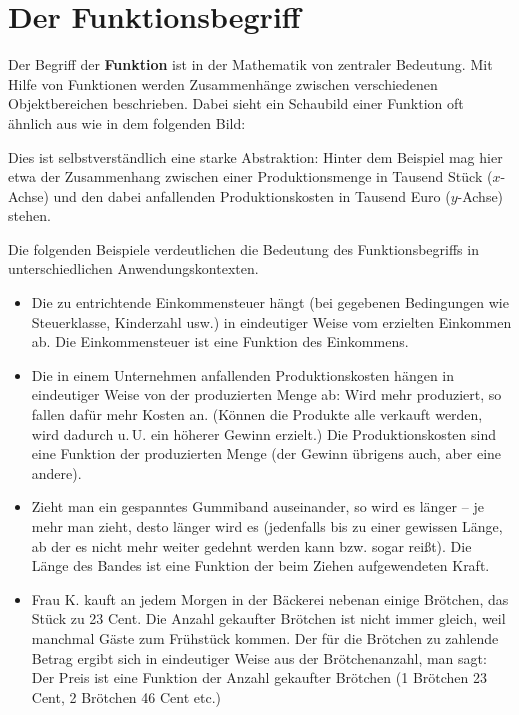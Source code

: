 \section{Der Funktionsbegriff}


Der Begriff der \textbf{Funktion} ist in der Mathematik von zentraler Bedeutung. Mit Hilfe von Funktionen werden Zusammenhänge zwischen verschiedenen Objektbereichen beschrieben. Dabei sieht ein Schaubild einer Funktion oft ähnlich aus wie in dem folgenden Bild:

\begin{center}
\end{center}

Dies ist selbstverständlich eine starke Abstraktion: Hinter dem Beispiel mag hier etwa der Zusammenhang zwischen einer Produktionsmenge in Tausend Stück ($x$-Achse) und den dabei anfallenden Produktionskosten in Tausend Euro ($y$-Achse) stehen.

Die folgenden Beispiele verdeutlichen die Bedeutung des Funktionsbegriffs in unterschiedlichen Anwendungskontexten.
\begin{itemize}
  \item Die zu entrichtende Einkommensteuer hängt (bei gegebenen Bedingungen wie Steuerklasse, Kinderzahl usw.) in eindeutiger Weise vom erzielten Einkommen ab. Die Einkommensteuer ist eine Funktion des Einkommens.
  \item Die in einem Unternehmen anfallenden Produktionskosten hängen in eindeutiger Weise von der produzierten Menge ab: Wird mehr produziert, so fallen dafür mehr Kosten an. (Können die Produkte alle verkauft werden, wird dadurch u.\,U. ein höherer Gewinn erzielt.) Die Produktionskosten sind eine Funktion der produzierten Menge (der Gewinn übrigens auch, aber eine andere).
  \item Zieht man ein gespanntes Gummiband auseinander, so wird es länger -- je mehr man zieht, desto länger wird es (jedenfalls bis zu einer gewissen Länge, ab der es nicht mehr weiter gedehnt werden kann bzw. sogar reißt). Die Länge des Bandes ist eine Funktion der beim Ziehen aufgewendeten Kraft.
  \item Frau K. kauft an jedem Morgen in der Bäckerei nebenan einige Brötchen, das Stück zu 23 Cent. Die Anzahl gekaufter Brötchen ist nicht immer gleich, weil manchmal Gäste zum Frühstück kommen. Der für die Brötchen zu zahlende Betrag ergibt sich in eindeutiger Weise aus der Brötchenanzahl, man sagt: Der Preis ist eine Funktion der Anzahl gekaufter Brötchen (1 Brötchen 23 Cent, 2 Brötchen 46 Cent etc.)
\end{itemize}

